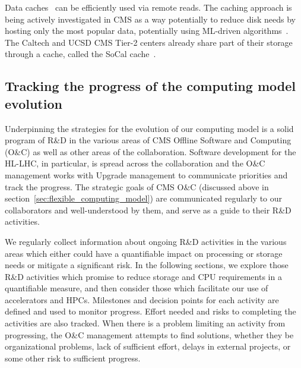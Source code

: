 \documentclass{cmspaper}
\begin{document}
Data caches~\cite{Fajardo_2018} can be efficiently used via remote reads. The caching approach is being actively investigated in CMS as a way potentially to reduce disk needs by hosting only the most popular data, potentially using ML-driven algorithms~\cite{aixcache, 9356236}. The Caltech and UCSD CMS Tier-2 centers already share part of their storage through a cache, called the SoCal cache~\cite{socal}.

\subsection{Tracking the progress of the computing model evolution}
\label{sec:framework}

Underpinning the strategies for the evolution of our computing model is a solid program of R\&D in the various areas of CMS Offline Software and Computing (O\&C) as well as other areas of the collaboration. Software development for the HL-LHC, in particular, is spread across the collaboration and the O\&C management works with Upgrade management to communicate priorities and track the progress. The strategic goals of CMS O\&C (discussed above in section~\ref{sec:flexible_computing_model}) are communicated regularly to our collaborators and well-understood by them, and serve as a guide to their R\&D activities. 

We regularly collect information about ongoing R\&D activities in the various areas which either could have a quantifiable impact on processing or storage needs or mitigate a significant risk. In the following sections, we explore those R\&D activities which promise to reduce storage and CPU requirements in a quantifiable measure, and then consider those which facilitate our use of accelerators and HPCs. Milestones and decision points for each activity are defined and used to monitor progress. Effort needed and risks to completing the activities are also tracked. 
When there is a problem limiting an activity from progressing, the O\&C management attempts to find solutions, whether they be organizational problems, lack of sufficient effort, delays in external projects, or some other risk to sufficient progress.
\end{document}
